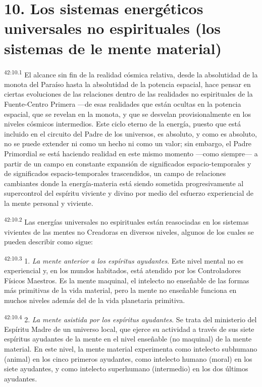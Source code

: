 \section*{10. Los sistemas energéticos universales no espirituales (los sistemas de le mente material)}
\par
\textsuperscript{42:10.1} El alcance sin fin de la realidad cósmica relativa, desde la absolutidad de la monota del Paraíso hasta la absolutidad de la potencia espacial, hace pensar en ciertas evoluciones de las relaciones dentro de las realidades no espirituales de la Fuente-Centro Primera ---de esas realidades que están ocultas en la potencia espacial, que se revelan en la monota, y que se desvelan provisionalmente en los niveles cósmicos intermedios. Este ciclo eterno de la energía, puesto que está incluido en el circuito del Padre de los universos, es absoluto, y como es absoluto, no se puede extender ni como un hecho ni como un valor; sin embargo, el Padre Primordial se está haciendo realidad en este mismo momento ---como siempre--- a partir de un campo en constante expansión de significados espacio-temporales y de significados espacio-temporales trascendidos, un campo de relaciones cambiantes donde la energía-materia está siendo sometida progresivamente al supercontrol del espíritu viviente y divino por medio del esfuerzo experiencial de la mente personal y viviente.

\par
\textsuperscript{42:10.2} Las energías universales no espirituales están reasociadas en los sistemas vivientes de las mentes no Creadoras en diversos niveles, algunos de los cuales se pueden describir como sigue:

\par
\textsuperscript{42:10.3} 1. \textit{La mente anterior a los espíritus ayudantes}. Este nivel mental no es experiencial y, en los mundos habitados, está atendido por los Controladores Físicos Maestros. Es la mente maquinal, el intelecto no enseñable de las formas más primitivas de la vida material, pero la mente no enseñable funciona en muchos niveles además del de la vida planetaria primitiva.

\par
\textsuperscript{42:10.4} 2. \textit{La mente asistida por los espíritus ayudantes}. Se trata del ministerio del Espíritu Madre de un universo local, que ejerce su actividad a través de sus siete espíritus ayudantes de la mente en el nivel enseñable (no maquinal) de la mente material. En este nivel, la mente material experimenta como intelecto subhumano (animal) en los cinco primeros ayudantes, como intelecto humano
(moral) en los siete ayudantes, y como intelecto superhumano (intermedio) en los dos últimos ayudantes.

